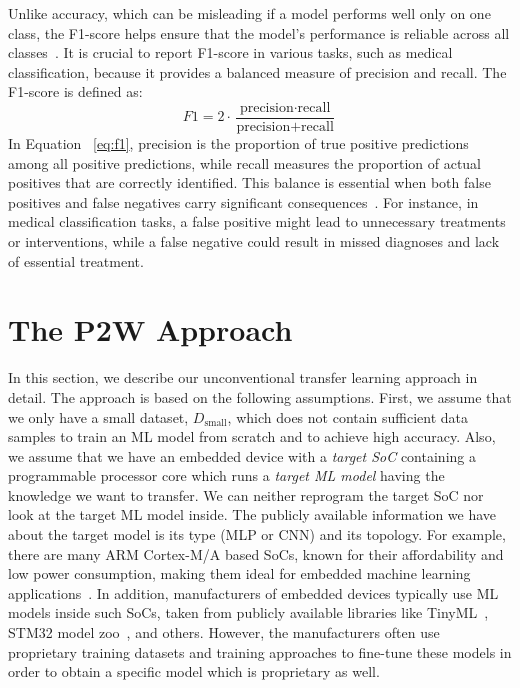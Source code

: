 \documentclass[letterpaper]{article}
\begin{document}
Unlike accuracy, which can be misleading if a model performs well only on one class, the F1-score helps ensure that the model’s performance is reliable across all classes~\cite{10.1007/11941439_114}. It is crucial to report F1-score in various tasks, such as medical classification, because it provides a balanced measure of precision and recall. The F1-score is defined as:
\begin{equation}
\label{eq:f1}
F1 = 2 \cdot \frac{\text{precision} \cdot \text{recall}}{\text{precision} + \text{recall}}
\end{equation}
In Equation ~\ref{eq:f1}, precision is the proportion of true positive predictions among all positive predictions, while recall measures the proportion of actual positives that are correctly identified. This balance is essential when both false positives and false negatives carry significant consequences~\cite{Taha2015}. For instance, in medical classification tasks, a false positive might lead to unnecessary treatments or interventions, while a false negative could result in missed diagnoses and lack of essential treatment. 


\section{The P2W Approach}
\label{sec:P2W}
In this section, we describe our unconventional transfer learning approach in detail. The approach is based on the following assumptions. First, we assume that we only have a small dataset, $D_{\text{small}}$, which does not contain sufficient data samples to train an ML model from scratch and to achieve high accuracy. Also, we assume that we have an embedded device with a \emph{target SoC} containing a programmable processor core which runs a \emph{target ML model} having the knowledge we want to transfer. We can neither reprogram the target SoC nor look at the target ML model inside. The publicly available information we have about the target model is its type (MLP or CNN) and its topology. For example, there are many ARM Cortex-M/A based SoCs, known for their affordability and low power consumption, making them ideal for embedded machine learning applications~\cite{noauthor_plumerai_nodate, electronics11162545}. In addition, manufacturers of embedded devices typically use ML models inside such SoCs, taken from publicly available libraries like TinyML~\cite{warden2019tinyml}, STM32 model zoo~\cite{noauthor_stmicroelectronics_2023}, and others. However, the manufacturers often use proprietary training datasets and training approaches to fine-tune these models in order to obtain a specific model which is proprietary as well. 
\end{document}
